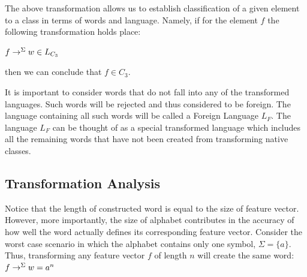 \documentclass{mini}
\begin{document}
The above transformation allows us to establish classification of a given element to a class in terms of words and language. Namely, if for the element $f$ the following transformation holds place:
\begin{center}
   $f \rightarrow^{\Sigma} w \in L_{C_3}$
\end{center}
then we can conclude that $f \in C_{3}$.

It is important to consider words that do not fall into any of the transformed languages. Such words will be rejected and thus considered to be foreign. The language containing all such words will be called a Foreign Language $L_{F}$. The language $L_{F}$ can be thought of as a special transformed language which includes all the remaining words that have not been created from transforming native classes.

\subsection{Transformation Analysis}\label{sec:lan_theory_transf_prec}

Notice that the length of constructed word is equal to the size of feature vector. However, more importantly, the size of alphabet contributes in the accuracy of how well the word actually defines its corresponding feature vector. Consider the worst case scenario in which the alphabet contains only one symbol, $\Sigma=\{a\}$. Thus, transforming any feature vector $f$ of length $n$ will create the same word: $f \rightarrow^{\Sigma} w = a^{n}$
\end{document}
